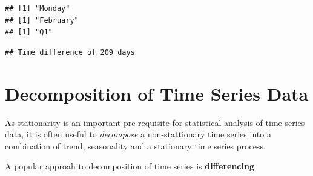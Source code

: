 \documentclass[11pt, letterpaper, twoside]{memoir}\usepackage{knitr}
\begin{document}
\begin{knitrout}
\color{fgcolor}\begin{kframe}
\begin{alltt}
 \hlkwb{<-} \hlstd{(}\hlstd{)}
  
\end{alltt}
\begin{verbatim}
## [1] "Monday"
## [1] "February"
## [1] "Q1"
\end{verbatim}
\begin{alltt}
 \hlkwb{<-} \hlstd{()} 
 \hlopt{-} 
\end{alltt}
\begin{verbatim}
## Time difference of 209 days
\end{verbatim}
\end{kframe}
\end{knitrout}

\section{Decomposition of Time Series Data}

As stationarity is an important pre-requisite for statistical analysis of time series data, it is often useful to \emph{decompose} a non-stattionary time series into a combination of trend, seasonality and a stationary time series process.

A popular approah to decomposition of time series is \textbf{differencing}
\end{document}
